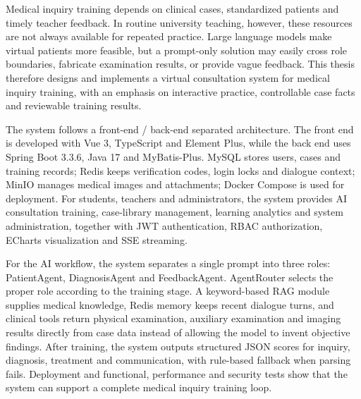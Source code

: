 
\begin{abstracten}

Medical inquiry training depends on clinical cases, standardized patients and timely teacher feedback. In routine university teaching, however, these resources are not always available for repeated practice. Large language models make virtual patients more feasible, but a prompt-only solution may easily cross role boundaries, fabricate examination results, or provide vague feedback. This thesis therefore designs and implements a virtual consultation system for medical inquiry training, with an emphasis on interactive practice, controllable case facts and reviewable training results.

The system follows a front-end / back-end separated architecture. The front end is developed with Vue 3, TypeScript and Element Plus, while the back end uses Spring Boot 3.3.6, Java 17 and MyBatis-Plus. MySQL stores users, cases and training records; Redis keeps verification codes, login locks and dialogue context; MinIO manages medical images and attachments; Docker Compose is used for deployment. For students, teachers and administrators, the system provides AI consultation training, case-library management, learning analytics and system administration, together with JWT authentication, RBAC authorization, ECharts visualization and SSE streaming.

For the AI workflow, the system separates a single prompt into three roles: PatientAgent, DiagnosisAgent and FeedbackAgent. AgentRouter selects the proper role according to the training stage. A keyword-based RAG module supplies medical knowledge, Redis memory keeps recent dialogue turns, and clinical tools return physical examination, auxiliary examination and imaging results directly from case data instead of allowing the model to invent objective findings. After training, the system outputs structured JSON scores for inquiry, diagnosis, treatment and communication, with rule-based fallback when parsing fails. Deployment and functional, performance and security tests show that the system can support a complete medical inquiry training loop.


\end{abstracten}

